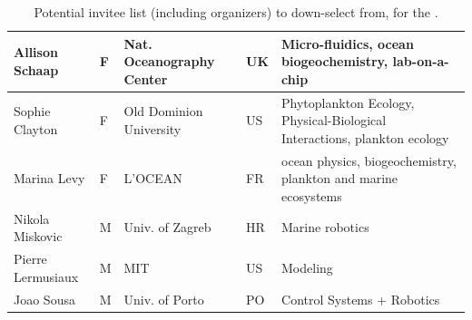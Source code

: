 \begin{table}[H]
{\begin{tabular}{|p{3cm}|p{0.7cm}|p{4.0cm}|p{0.5cm}|p{6.5cm}|}
\hline
Allison Schaap           & F   & Nat. Oceanography Center              & UK       & Micro-fluidics, ocean biogeochemistry, lab-on-a-chip\\
\hline
Sophie Clayton           & F   & Old Dominion University              & US       & Phytoplankton Ecology, Physical-Biological Interactions, plankton ecology\\
\hline
Marina Levy              & F   & L'OCEAN                              & FR       & ocean physics, biogeochemistry, plankton and marine ecosystems\\
\hline
Nikola Miskovic          & M   & Univ. of Zagreb                       & HR  & Marine robotics                                 \\
\hline
Pierre Lermusiaux        & M   & MIT                                   & US       & Modeling                                        \\
\hline
Joao Sousa               & M   & Univ. of Porto                        & PO       & Control Systems + Robotics                      \\
\hline
\end{tabular}
}
  \caption{Potential invitee list (including organizers) to down-select from, for the \sympe.}
  \label{tab:part}
\end{table}


